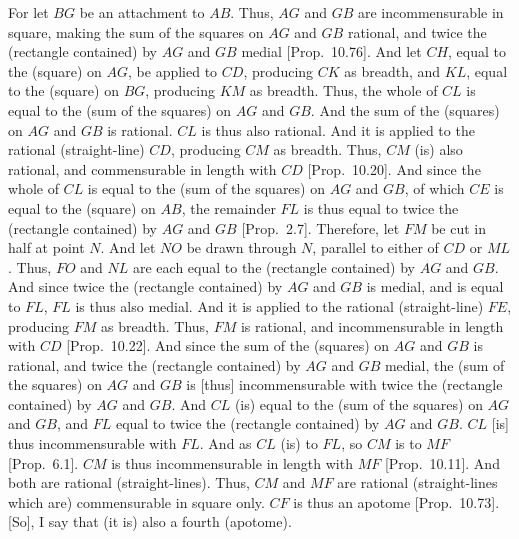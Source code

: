 \begin{Parallel}{}{}
{For let $BG$ be an attachment to $AB$. Thus, $AG$ and $GB$ are incommensurable in square, making the sum of the squares on $AG$ and $GB$ rational, and twice the (rectangle contained) by $AG$ and $GB$ medial [Prop.~10.76]. And let $CH$,
equal to the (square) on $AG$, be applied to $CD$, producing
$CK$ as breadth, and $KL$, equal to the (square) on $BG$, producing
$KM$ as breadth. Thus, the whole of $CL$ is equal to the (sum of the
squares) on $AG$ and $GB$. And the sum of the (squares) on $AG$ and
$GB$ is rational. $CL$ is thus also rational. And it is applied to the
rational (straight-line) $CD$, producing $CM$ as breadth. Thus, $CM$
(is) also rational, and commensurable in length with $CD$ [Prop.~10.20]. And since the whole of $CL$
is equal to the (sum of the squares) on $AG$ and $GB$, of which
$CE$ is equal to the (square) on $AB$, the remainder $FL$ is thus
equal to twice the (rectangle contained) by $AG$ and $GB$ [Prop.~2.7]. Therefore, let $FM$ be cut in
half at point $N$. And let $NO$ be drawn through $N$, parallel
to either of $CD$ or $ML$. Thus, $FO$ and $NL$ are each
equal to the (rectangle contained) by $AG$ and $GB$. And since
twice the (rectangle contained) by $AG$ and $GB$ is medial, and is equal
to $FL$, $FL$ is thus also medial. And it is applied to the rational (straight-line) $FE$, producing $FM$ as breadth. Thus, $FM$ is  rational, and incommensurable in length with $CD$ [Prop.~10.22]. And since the sum of the (squares)
on $AG$ and $GB$ is rational, and twice the (rectangle contained) by $AG$
and $GB$ medial, the (sum of the squares) on $AG$ and $GB$
is [thus] incommensurable with twice the (rectangle contained)
by $AG$ and $GB$. And $CL$ (is) equal to the (sum of the squares)
on $AG$ and $GB$, and $FL$ equal to twice the (rectangle contained) by $AG$ and $GB$. $CL$ [is] thus incommensurable with $FL$. And as
$CL$ (is) to $FL$, so $CM$ is to $MF$ [Prop.~6.1]. 
$CM$ is thus incommensurable in length with $MF$ [Prop.~10.11]. And both are rational (straight-lines). 
Thus, $CM$ and $MF$ are rational (straight-lines which are) commensurable
in square only. $CF$ is thus an apotome [Prop.~10.73]. [So], I say that (it is) also
a fourth (apotome).

}
\end{Parallel}
